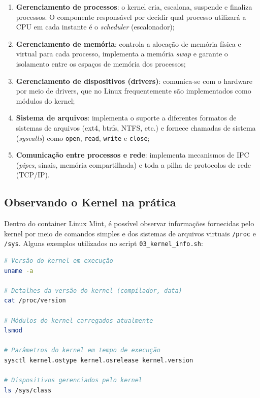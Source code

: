 \documentclass[a4paper,12pt]{article}
\begin{document}
\begin{enumerate}
    \item \textbf{Gerenciamento de processos}: o kernel cria, escalona,
          suspende e finaliza processos. O componente responsável por
          decidir qual processo utilizará a CPU em cada instante é o
          \textit{scheduler} (escalonador);
    \item \textbf{Gerenciamento de memória}: controla a alocação de memória
          física e virtual para cada processo, implementa a memória
          \textit{swap} e garante o isolamento entre os espaços de memória
          dos processos;
    \item \textbf{Gerenciamento de dispositivos (drivers)}: comunica-se com
          o hardware por meio de drivers, que no Linux frequentemente são
          implementados como módulos do kernel;
    \item \textbf{Sistema de arquivos}: implementa o suporte a diferentes
          formatos de sistemas de arquivos (ext4, btrfs, NTFS, etc.) e
          fornece chamadas de sistema (\textit{syscalls}) como
          \texttt{open}, \texttt{read}, \texttt{write} e \texttt{close};
    \item \textbf{Comunicação entre processos e rede}: implementa
          mecanismos de IPC (\textit{pipes}, sinais, memória compartilhada)
          e toda a pilha de protocolos de rede (TCP/IP).
\end{enumerate}

\subsection{Observando o Kernel na prática}

Dentro do container Linux Mint, é possível observar informações fornecidas
pelo kernel por meio de comandos simples e dos sistemas de arquivos virtuais
\texttt{/proc} e \texttt{/sys}. Alguns exemplos utilizados no script
\texttt{03\_kernel\_info.sh}:

\begin{lstlisting}[language=bash, caption={Comandos para inspecionar o Kernel}]
# Versão do kernel em execução
uname -a

# Detalhes da versão do kernel (compilador, data)
cat /proc/version

# Módulos do kernel carregados atualmente
lsmod

# Parâmetros do kernel em tempo de execução
sysctl kernel.ostype kernel.osrelease kernel.version

# Dispositivos gerenciados pelo kernel
ls /sys/class
\end{lstlisting}
\end{document}
